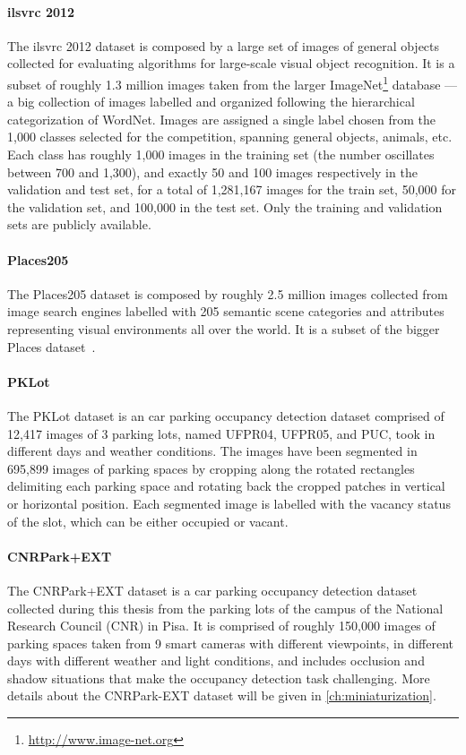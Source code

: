 \paragraph{\acrfull{ilsvrc} 2012~~\cite{russakovsky2015imagenet}}
The \acrfull{ilsvrc} 2012 dataset is composed by a large set of images of general objects collected for evaluating algorithms for large-scale visual object recognition.
It is a subset of roughly 1.3 million images taken from the larger ImageNet\footnote{\url{http://www.image-net.org}} database --- a big collection of images labelled and organized following the hierarchical categorization of WordNet.
Images are assigned a single label chosen from the 1,000 classes selected for the competition, spanning general objects, animals, etc.
Each class has roughly 1,000 images in the training set (the number oscillates between 700 and 1,300), and exactly 50 and 100 images respectively in the validation and test set, for a total of 1,281,167 images for the train set, 50,000 for the validation set, and 100,000 in the test set.
Only the training and validation sets are publicly available.

\paragraph{Places205~\cite{zhou2014learning}}
The Places205 dataset is composed by roughly 2.5 million images collected from image search engines labelled with 205 semantic scene categories and attributes representing visual environments all over the world.
It is a subset of the bigger Places dataset~\cite{zhou2016places}.

\paragraph{PKLot~\cite{de2015pklot}}
The PKLot dataset is an car parking occupancy detection dataset comprised of 12,417 images of 3 parking lots, named UFPR04, UFPR05, and PUC, took in different days and weather conditions.
The images have been segmented in 695,899 images of parking spaces by cropping along the rotated rectangles delimiting each parking space and rotating back the cropped patches in vertical or horizontal position.
Each segmented image is labelled with the vacancy status of the slot, which can be either occupied or vacant.

\paragraph{CNRPark+EXT~\cite{amato2016car,amato2017deep}}
The CNRPark+EXT dataset is a car parking occupancy detection dataset collected during this thesis from the parking lots of the campus of the National Research Council (CNR) in Pisa.
It is comprised of roughly 150,000 images of parking spaces taken from 9 smart cameras with different viewpoints, in different days with different weather and light conditions, and includes occlusion and shadow situations that make the occupancy detection task challenging.
More details about the CNRPark-EXT dataset will
be given in \ref{ch:miniaturization}.

